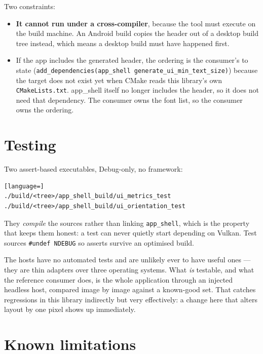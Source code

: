 \documentclass[11pt,a4paper]{article}
\begin{document}
Two constraints:

\begin{itemize}[leftmargin=*]
\item \textbf{It cannot run under a cross-compiler}, because the tool must
  execute on the build machine. An Android build copies the header out of a
  desktop build tree instead, which means a desktop build must have happened
  first.
\item If the app includes the generated header, the ordering is the
  consumer's to state (\texttt{add\_dependencies(app\_shell
  generate\_ui\_min\_text\_size)}) because the target does not exist yet when
  CMake reads this library's own \texttt{CMakeLists.txt}. app\_shell itself no
  longer includes the header, so it does not need that dependency. The consumer
  owns the font list, so the consumer owns the ordering.
\end{itemize}

\section{Testing}

Two assert-based executables, Debug-only, no framework:

\begin{lstlisting}[language=]
./build/<tree>/app_shell_build/ui_metrics_test
./build/<tree>/app_shell_build/ui_orientation_test
\end{lstlisting}

They \emph{compile} the sources rather than linking \texttt{app\_shell}, which
is the property that keeps them honest: a test can never quietly start depending
on Vulkan. Test sources \texttt{\#undef NDEBUG} so asserts survive an optimised
build.

The hosts have no automated tests and are unlikely ever to have useful ones ---
they are thin adapters over three operating systems. What \emph{is} testable, and
what the reference consumer does, is the whole application through an injected
headless host, compared image by image against a known-good set. That catches
regressions in this library indirectly but very effectively: a change here that
alters layout by one pixel shows up immediately.

\section{Known limitations}
\end{document}
